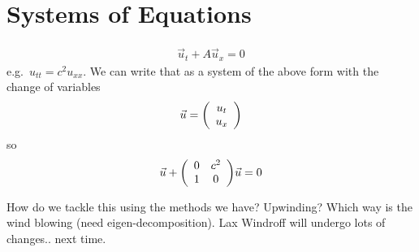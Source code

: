 \documentclass{article}
\begin{document}
    \section{Systems of Equations}
        \begin{align*}
            \vec{u}_t + A\vec{u}_x = 0
        \end{align*}
        e.g.~$u_{tt} = c^2u_{xx}$.  We can write that as a system of the above form with the change of variables
        \begin{align*}
            \vec{u} = \qty(\begin{array}{c} u_t \\ u_x \end{array})
        \end{align*}
        so
        \begin{align*}
            \vec{u} + \qty(\begin{array}{cc} 0 & c^2 \\ 1 & 0\end{array})\vec{u} = 0
        \end{align*}

        How do we tackle this using the methods we have?  Upwinding?  Which way is the wind blowing (need eigen-decomposition).  Lax Windroff will undergo lots of changes.. next time.
\end{document}
